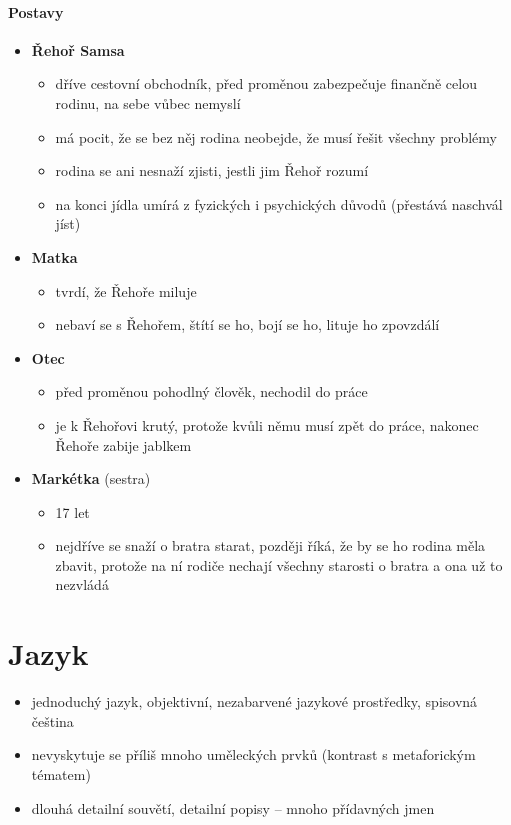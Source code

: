 \documentclass[10pt,a4paper]{article}
\begin{document}
\paragraph{Postavy}
\begin{itemize}
\item \textbf{Řehoř Samsa}
	\begin{itemize}
	\item dříve cestovní obchodník, před proměnou zabezpečuje finančně celou rodinu, na sebe vůbec nemyslí
	\item má pocit, že se bez něj rodina neobejde, že musí řešit všechny problémy
	\item rodina se ani nesnaží zjisti, jestli jim Řehoř rozumí
	\item na konci jídla umírá z fyzických i psychických důvodů (přestává naschvál jíst)
	\end{itemize}
\item \textbf{Matka}
	\begin{itemize}
	\item tvrdí, že Řehoře miluje
	\item nebaví se s Řehořem, štítí se ho, bojí se ho, lituje ho zpovzdálí
	\end{itemize}
\item \textbf{Otec}
	\begin{itemize}
	\item před proměnou pohodlný člověk, nechodil do práce
	\item je k Řehořovi krutý, protože kvůli němu musí zpět do práce, nakonec Řehoře zabije jablkem
	\end{itemize}
\item \textbf{Markétka} (sestra)
	\begin{itemize}
	\item 17 let
	\item nejdříve se snaží o bratra starat, později říká, že by se ho rodina měla zbavit, protože na ní rodiče nechají všechny starosti o bratra a ona už to nezvládá
	
	\end{itemize}
\end{itemize}
\section*{Jazyk}
\begin{itemize}
\item jednoduchý jazyk, objektivní, nezabarvené jazykové prostředky, spisovná čeština
\item nevyskytuje se příliš mnoho uměleckých prvků (kontrast s metaforickým tématem)
\item dlouhá detailní souvětí, detailní popisy -- mnoho přídavných jmen
\end{itemize}
\end{document}
